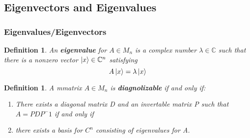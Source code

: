 \documentclass[12pt]{article}
\theoremstyle{plain}
\theoremstyle{nonumberplain}
\theoremstyle{plain}
\newtheorem{definition}[lemma]{Definition}
\theoremstyle{nonumberplain}
\newcommand\1{{\bf 1}}
\newcommand{\C}{\mathbb{C}} %
\newcommand{\<}{\left\langle}
\renewcommand{\>}{\right\rangle}
\begin{document}
\pagebreak

\subsection{Eigenvectors and Eigenvalues}

\subsubsection{Eigenvalues/Eigenvectors}

\begin{definition}
An \textbf{eigenvalue} for $A \in M_n$ is a complex number $\lambda \in \C$ such that there is a nonzero vector $\ket{x} \in \C^n$ satisfying
\begin{equation}
A\ket{x} = \lambda\ket{x}
\end{equation}
\end{definition}

\begin{definition}
A mmatrix $A \in M_n$ is \textbf{diagnolizable} if and only if:
\begin{enumerate}
\item There exists a diagonal matrix D and an invertable matrix P such that $A = PDP^-1$ if and only if
\item there exists a basis for $C^n$ consisting of eigenvalues for A. 
\end{enumerate}
\end{definition}
\end{document}
